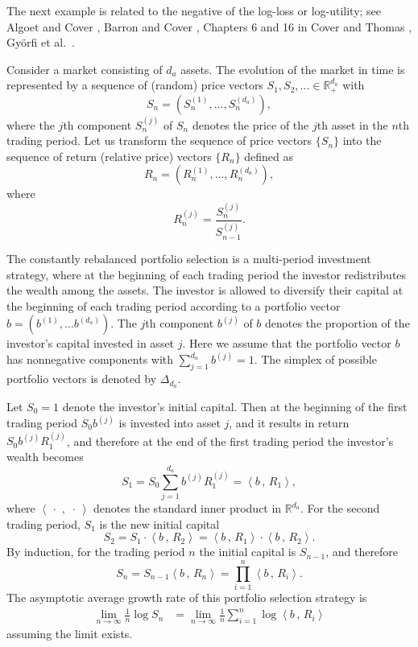 \documentclass[11pt]{article}
\def\R{{\mathbb R}}
\newcommand\ip[2]{ \left\langle{#1} \, ,\, {#2} \right\rangle } %
\begin{document}
The next example is related to  the negative of the log-loss or log-utility; see
Algoet and Cover \cite{AlCo88},
Barron and Cover \cite{BaCo88},
Chapters 6 and 16 in Cover and Thomas \cite{CoTh06},
Gy\"orfi et al.\ \cite{GyOtUr11}. 


Consider a market consisting of $d_a$ assets.
The evolution of the market in time is represented by a
sequence of (random) price vectors $S_1,S_2,\ldots \in \R_+^{d_a}$ with 
\[
S_n=(S_n^{(1)},\dots ,S_n^{(d_a)}), 
\]
where 
the $j$th component $S_n^{(j)}$ of $S_n$ denotes
the price of the $j$th asset
in the $n$th trading period.
Let us transform the sequence of price vectors $\{S_n\}$ into the sequence of
return (relative price) vectors $\{R_n\}$ defined as 
\[
R_n=(R_n^{(1)},\dots ,R_n^{(d_a)}),
\]
where 
\[
R_n^{(j)}=\frac{S_n^{(j)}}{S_{n-1}^{(j)}}.
\]

The constantly rebalanced portfolio selection
is a multi-period investment strategy, where at the beginning of
each trading period the investor redistributes the wealth among the assets.
The investor is allowed to
diversify their capital at the beginning of each trading period
according to a portfolio vector $b=(b^{(1)},\dots b^{(d_a)})$. The
$j$th component $b^{(j)}$ of $b$ denotes the proportion of the
investor's capital invested in asset $j$. Here we  assume that the portfolio vector $b$ has nonnegative components with $\sum_{j=1}^{d_a} b^{(j)} =1$.  The simplex of possible portfolio
vectors is denoted by $\Delta_{d_a}$.

Let $S_0=1$ denote the investor's initial capital.
Then at the beginning of the first trading period
$S_0 b^{(j)}$ is invested into asset $j$,
and it results in return $S_0b^{(j)}R_1^{(j)}$, and therefore
at the end of the first trading period
the investor's  wealth becomes
\[
S_1 = S_0 \sum_{j=1}^{d_a} b^{(j)}R_1^{(j)} = \ip{b}{R_1},
\]
where $\ip{\,\cdot\,}{\,\cdot\,}$ denotes the standard inner product in $\R^{d_a}$.
For the second trading period, $S_1$ is the new initial capital
\[
S_2=S_1 \cdot \ip{b}{R_2}
= \ip{b}{R_1} \cdot \ip{b}{R_2}.
\]
By induction, for the trading period $n$ the initial capital
is $S_{n-1}$, and therefore
\[
S_n =  S_{n-1} \ip{b}{R_n}=\prod_{i=1}^n \ip{b}{R_i}.
\]
The asymptotic average growth rate of this portfolio selection strategy is
\begin{align*}
\lim_{n\to \infty} \frac 1n \log S_n
&=\lim_{n\to \infty} \frac 1n \sum_{i=1}^n \log\ip{b}{R_i}
\end{align*}
assuming the limit exists. 
\end{document}
